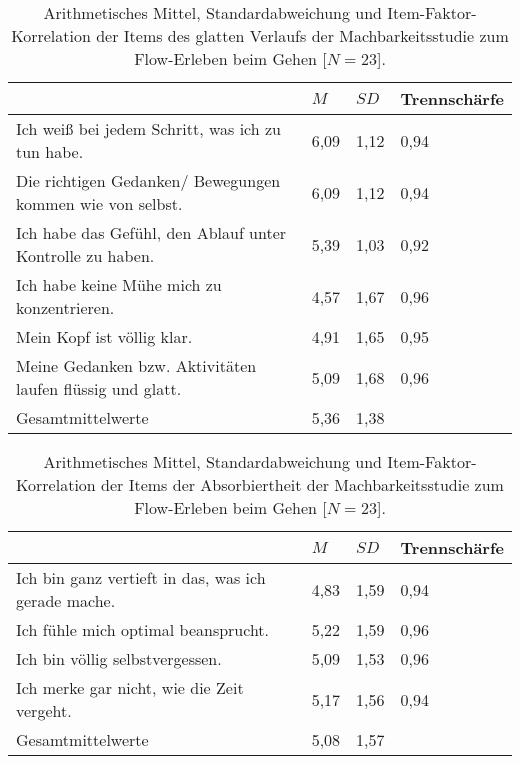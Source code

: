 \begin{table}
	[!htb] \centering \caption[Item-Faktor-Korrelation der Items des glatten Verlaufs (Gehstudie -- intraindividuell).]{Arithmetisches Mittel, Standardabweichung und Item-Faktor-Korrelation der Items des glatten Verlaufs der Machbarkeitsstudie zum Flow-Erleben beim Gehen [$N = 23$].} \label{tab:glatter_verlauf_2} 
	\begin{tabularx}
		{ 
		\textwidth}{p{} p{} p{} p{}} \toprule & $M$ & $SD$ & Trennschärfe \\
		\midrule Ich weiß bei jedem Schritt, was ich zu tun habe. & 6,09 & 1,12 & 0,94 \\
		Die richtigen Gedanken/ Bewegungen kommen wie von selbst. & 6,09 & 1,12 & 0,94 \\
		Ich habe das Gefühl, den Ablauf unter Kontrolle zu haben. & 5,39 & 1,03 & 0,92 \\
		Ich habe keine Mühe mich zu konzentrieren. & 4,57 & 1,67 & 0,96 \\
		Mein Kopf ist völlig klar. & 4,91 & 1,65 & 0,95 \\
		Meine Gedanken bzw. Aktivitäten laufen flüssig und glatt. & 5,09 & 1,68 & 0,96 \\
		Gesamtmittelwerte & 5,36 & 1,38 & \\
		\bottomrule 
	\end{tabularx}
\end{table}
\begin{table}
	[!htb] \centering \caption[Item-Faktor-Korrelation der Items der Absorbiertheit (Gehstudie -- intraindividuell).]{Arithmetisches Mittel, Standardabweichung und Item-Faktor-Korrelation der Items der Absorbiertheit der Machbarkeitsstudie zum Flow-Erleben beim Gehen [$N = 23$].} \label{tab:absorbiertheit_2} 
	\begin{tabularx}
		{ 
		\textwidth}{p{} p{} p{} p{}} \toprule & $M$ & $SD$ & Trennschärfe \\
		\midrule Ich bin ganz vertieft in das, was ich gerade mache. & 4,83 & 1,59 & 0,94 \\
		Ich fühle mich optimal beansprucht. & 5,22 & 1,59 & 0,96 \\
		Ich bin völlig selbstvergessen. & 5,09 & 1,53 & 0,96 \\
		Ich merke gar nicht, wie die Zeit vergeht. & 5,17 & 1,56 & 0,94 \\
		Gesamtmittelwerte & 5,08 & 1,57 & \\
		\bottomrule 
	\end{tabularx}
\end{table}


